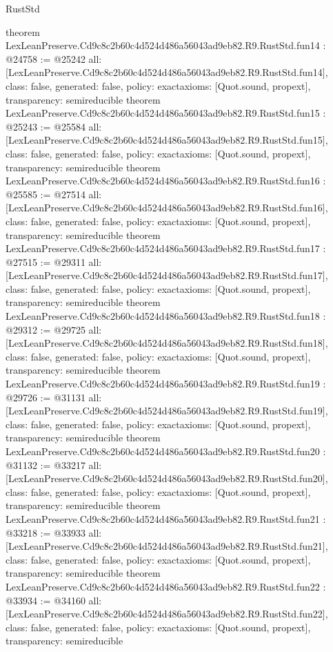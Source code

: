 \begin{lexlean}{RustStd}
\begin{coremodule}
{}
theorem LexLeanPreserve.Cd9c8c2b60c4d524d486a56043ad9eb82.R9.RustStd.fun14 : @24758 := @25242 {
  all: [LexLeanPreserve.Cd9c8c2b60c4d524d486a56043ad9eb82.R9.RustStd.fun14],
  class: false,
  generated: false,
  policy: exact{axioms: [Quot.sound, propext]},
  transparency: semireducible
}
theorem LexLeanPreserve.Cd9c8c2b60c4d524d486a56043ad9eb82.R9.RustStd.fun15 : @25243 := @25584 {
  all: [LexLeanPreserve.Cd9c8c2b60c4d524d486a56043ad9eb82.R9.RustStd.fun15],
  class: false,
  generated: false,
  policy: exact{axioms: [Quot.sound, propext]},
  transparency: semireducible
}
theorem LexLeanPreserve.Cd9c8c2b60c4d524d486a56043ad9eb82.R9.RustStd.fun16 : @25585 := @27514 {
  all: [LexLeanPreserve.Cd9c8c2b60c4d524d486a56043ad9eb82.R9.RustStd.fun16],
  class: false,
  generated: false,
  policy: exact{axioms: [Quot.sound, propext]},
  transparency: semireducible
}
theorem LexLeanPreserve.Cd9c8c2b60c4d524d486a56043ad9eb82.R9.RustStd.fun17 : @27515 := @29311 {
  all: [LexLeanPreserve.Cd9c8c2b60c4d524d486a56043ad9eb82.R9.RustStd.fun17],
  class: false,
  generated: false,
  policy: exact{axioms: [Quot.sound, propext]},
  transparency: semireducible
}
theorem LexLeanPreserve.Cd9c8c2b60c4d524d486a56043ad9eb82.R9.RustStd.fun18 : @29312 := @29725 {
  all: [LexLeanPreserve.Cd9c8c2b60c4d524d486a56043ad9eb82.R9.RustStd.fun18],
  class: false,
  generated: false,
  policy: exact{axioms: [Quot.sound, propext]},
  transparency: semireducible
}
theorem LexLeanPreserve.Cd9c8c2b60c4d524d486a56043ad9eb82.R9.RustStd.fun19 : @29726 := @31131 {
  all: [LexLeanPreserve.Cd9c8c2b60c4d524d486a56043ad9eb82.R9.RustStd.fun19],
  class: false,
  generated: false,
  policy: exact{axioms: [Quot.sound, propext]},
  transparency: semireducible
}
theorem LexLeanPreserve.Cd9c8c2b60c4d524d486a56043ad9eb82.R9.RustStd.fun20 : @31132 := @33217 {
  all: [LexLeanPreserve.Cd9c8c2b60c4d524d486a56043ad9eb82.R9.RustStd.fun20],
  class: false,
  generated: false,
  policy: exact{axioms: [Quot.sound, propext]},
  transparency: semireducible
}
theorem LexLeanPreserve.Cd9c8c2b60c4d524d486a56043ad9eb82.R9.RustStd.fun21 : @33218 := @33933 {
  all: [LexLeanPreserve.Cd9c8c2b60c4d524d486a56043ad9eb82.R9.RustStd.fun21],
  class: false,
  generated: false,
  policy: exact{axioms: [Quot.sound, propext]},
  transparency: semireducible
}
theorem LexLeanPreserve.Cd9c8c2b60c4d524d486a56043ad9eb82.R9.RustStd.fun22 : @33934 := @34160 {
  all: [LexLeanPreserve.Cd9c8c2b60c4d524d486a56043ad9eb82.R9.RustStd.fun22],
  class: false,
  generated: false,
  policy: exact{axioms: [Quot.sound, propext]},
  transparency: semireducible
}
\end{coremodule}
\end{lexlean}
